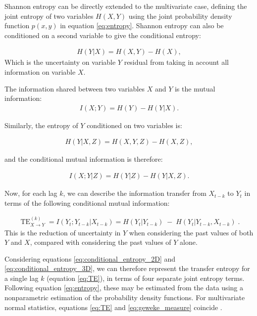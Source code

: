 \documentclass[]{rsos}%
\begin{document}
 Shannon entropy can be directly extended to the multivariate case, defining the joint entropy of two variables $H(X,Y)$ using the joint probability density function $p(x,y)$ in equation \ref{eq:entropy}. Shannon entropy can also be conditioned on a second variable to give the conditional entropy:

  \begin{eqnarray}
    \label{eq:conditional_entropy_2D}
    H(Y | X) = H(X,Y) - H(X) ,
  \end{eqnarray}
Which is the uncertainty on variable $Y$ residual from taking in account all information on variable $X$. 

 The information shared between two variables $X$ and $Y$ is the mutual information:
  \begin{eqnarray}
    \label{eq:mutual_information}
    I(X;Y) = H(Y) - H(Y | X) .
  \end{eqnarray}
 
 Similarly, the entropy of $Y$ conditioned on two variables is:

  \begin{eqnarray}
    \label{eq:conditional_entropy_3D}
    H(Y | X, Z) = H(X,Y,Z) - H(X, Z) ,
  \end{eqnarray}
  
  and the conditional mutual information is therefore:

  \begin{eqnarray}
    \label{eq:conditional_mutual_information}
    I(X;Y|Z) = H(Y|Z) - H(Y | X, Z) .
  \end{eqnarray}

  Now, for each lag $k$, we can describe the information transfer from $X_{t-k}$ to $Y_t$ in terms of the following conditional mutual information:

  \begin{eqnarray}
      \label{eq:TE}
      \operatorname{TE}^{(k)}_{\textbf{}X \rightarrow Y} = I(Y_t ;Y_{t-k} | X_{t-k} ) = H(Y_t | Y_{t-k}) \; - \;  H(Y_t | Y_{t-k}, X_{t-k} ) \;.
  \end{eqnarray}
 This is the reduction of uncertainty in $Y$ when considering the past values of both $Y$ and $X$, compared with considering the past values of $Y$ alone. 

  Considering equations \ref{eq:conditional_entropy_2D} and \ref{eq:conditional_entropy_3D}, we can therefore represent the transfer entropy for a single lag $k$ (equation \ref{eq:TE}), in terms of four separate joint entropy terms. Following equation \ref{eq:entropy}, these may be estimated from the data using a nonparametric  estimation of the probability density functions. For multivariate normal statistics, equations \ref{eq:TE} and \ref{eq:geweke_measure} coincide \cite{barnett2009granger}.
\end{document}
